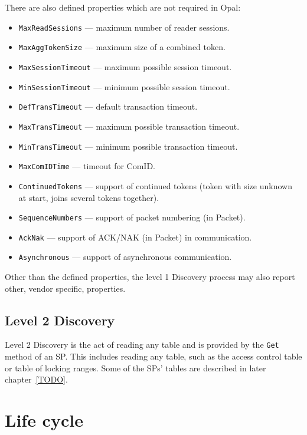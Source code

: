 There are also defined properties which are not required in Opal:
\begin{itemize}
\item \verb|MaxReadSessions| --- maximum number of reader sessions.
\item \verb|MaxAggTokenSize| --- maximum size of a combined token.
\item \verb|MaxSessionTimeout| --- maximum possible session timeout.
\item \verb|MinSessionTimeout| --- minimum possible session timeout.
\item \verb|DefTransTimeout| --- default transaction timeout.
\item \verb|MaxTransTimeout| --- maximum possible transaction timeout.
\item \verb|MinTransTimeout| --- minimum possible transaction timeout.
\item \verb|MaxComIDTime| --- timeout for ComID.
\item \verb|ContinuedTokens| --- support of continued tokens (token with size unknown at start, joins several tokens together).
\item \verb|SequenceNumbers| --- support of packet numbering (in Packet).
\item \verb|AckNak| --- support of ACK/NAK (in Packet) in communication.
\item \verb|Asynchronous| --- support of asynchronous communication.
\end{itemize}

Other than the defined properties, the level 1 Discovery process may also report other, vendor specific, properties.

\subsection{Level 2 Discovery}

Level 2 Discovery is the act of reading any table and is provided by the \verb|Get| method of an SP. This includes reading any table, such as the access control table or table of locking ranges. Some of the SPs' tables are described in later chapter~\ref{TODO}.

\section{Life cycle}

